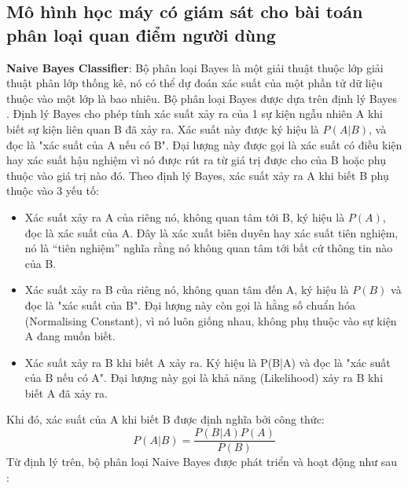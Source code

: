 \subsection{Mô hình học máy có giám sát cho bài toán phân loại quan điểm người dùng}
\textbf{Naive Bayes Classifier}: Bộ phân loại Bayes là một giải thuật thuộc lớp giải thuật phân lớp thống kê, nó có
thể dự đoán xác suất của một phần tử dữ liệu thuộc vào một lớp là bao nhiêu. Bộ phân
loại Bayes được dựa trên định lý Bayes \cite{nam2012nguyen}. Định lý Bayes cho phép tính xác 
suất xảy ra của 1 sự kiện ngẫu nhiên A khi biết sự kiện liên quan B đã xảy ra. Xác suất này được 
ký hiệu là $P(A|B)$, và đọc là "xác suất của A nếu có B". Đại lượng này được gọi là xác suất có 
điều kiện hay xác suất hậu nghiệm vì nó được rút ra từ giá trị được cho của B hoặc phụ thuộc 
vào giá trị nào đó. Theo định lý Bayes, xác suất xảy ra A khi biết B phụ thuộc vào 3 yếu tố:
\begin{itemize}
    \item Xác suất xảy ra A của riêng nó, không quan tâm tới B, ký hiệu là $P(A)$, đọc là xác 
        suất của A. Đây là xác xuất biên duyên hay xác suất tiên nghiệm, nó là “tiên nghiệm” 
        nghĩa rằng nó không quan tâm tới bất cứ thông tin nào của B.
    \item Xác suất xảy ra B của riêng nó, không quan tâm đến A, ký hiệu là $P(B)$ và đọc là 
        "xác suất của B". Đại lượng này còn gọi là hằng số chuẩn hóa (Normalising Constant), vì 
        nó luôn giống nhau, không phụ thuộc vào sự kiện A đang muốn biết.
    \item Xác suất xảy ra B khi biết A xảy ra. Ký hiệu là P(B|A) và đọc là "xác suất của B
    nếu có A". Đại lượng này gọi là khả năng (Likelihood) xảy ra B khi biết A đã xảy ra.
\end{itemize}
Khi đó, xác suất của A khi biết B được định nghĩa bởi công thức:
\begin{equation}
    P(A|B)=\frac{P(B|A)P(A)}{P(B)}
\end{equation}
Từ định lý trên, bộ phân loại Naive Bayes được phát triển và hoạt động như sau \cite{bayes1968naive}:
